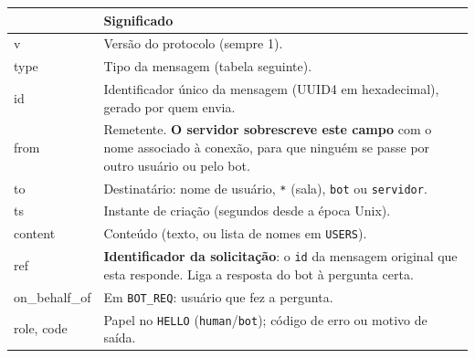 \documentclass[11pt,a4paper]{article}
\newcommand{\cod}[1]{\texttt{#1}}
\begin{document}
\begin{center}
\small
\begin{tabularx}{\linewidth}{>{\ttfamily}l X}
\toprule
{\normalfont\bfseries Campo} & \textbf{Significado} \\
\midrule
v       & Versão do protocolo (sempre 1). \\
type    & Tipo da mensagem (tabela seguinte). \\
id      & Identificador único da mensagem (UUID4 em hexadecimal), gerado por quem envia. \\
from    & Remetente. \textbf{O servidor sobrescreve este campo} com o nome associado à conexão, para
          que ninguém se passe por outro usuário ou pelo bot. \\
to      & Destinatário: nome de usuário, \cod{*} (sala), \cod{bot} ou \cod{servidor}. \\
ts      & Instante de criação (segundos desde a época Unix). \\
content & Conteúdo (texto, ou lista de nomes em \cod{USERS}). \\
ref     & \textbf{Identificador da solicitação}: o \cod{id} da mensagem original que esta responde.
          Liga a resposta do bot à pergunta certa. \\
on\_behalf\_of & Em \cod{BOT\_REQ}: usuário que fez a pergunta. \\
role, code & Papel no \cod{HELLO} (\cod{human}/\cod{bot}); código de erro ou motivo de saída. \\
\bottomrule
\end{tabularx}
\end{center}
\end{document}
